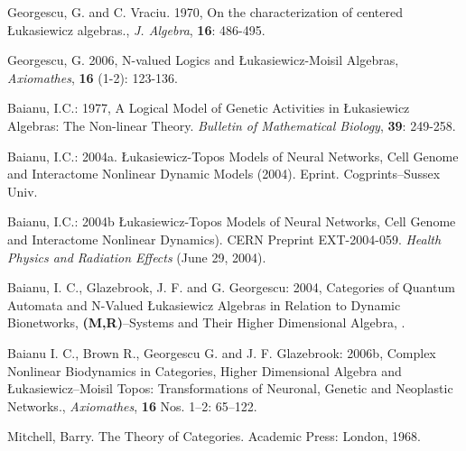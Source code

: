 \documentclass[12pt]{article}
\theoremstyle{plain}
\theoremstyle{definition}
\begin{document}
\begin{thebibliography}{9}

Georgescu, G. and C. Vraciu. 1970, On the characterization of centered \L{}ukasiewicz
algebras., {\em J. Algebra}, \textbf{16}: 486-495.

Georgescu, G. 2006, N-valued Logics and \L ukasiewicz-Moisil Algebras, \emph{Axiomathes}, \textbf{16} (1-2): 123-136.

Baianu, I.C.: 1977, A Logical Model of Genetic Activities in \L ukasiewicz Algebras: The Non-linear Theory. \emph{Bulletin of Mathematical Biology}, \textbf{39}: 249-258.

Baianu, I.C.: 2004a. \L{}ukasiewicz-Topos Models of Neural Networks, Cell Genome and Interactome Nonlinear Dynamic Models (2004). Eprint. Cogprints--Sussex Univ. 

Baianu, I.C.: 2004b \L{}ukasiewicz-Topos Models of Neural Networks, Cell Genome and Interactome Nonlinear Dynamics). CERN Preprint EXT-2004-059. \textit{Health Physics and Radiation Effects} (June 29, 2004). 
 
Baianu, I. C., Glazebrook, J. F. and G. Georgescu: 2004, Categories of Quantum Automata and N-Valued \L ukasiewicz Algebras in Relation to Dynamic Bionetworks, \textbf{(M,R)}--Systems and Their Higher Dimensional Algebra,
 . 

Baianu I. C., Brown R., Georgescu G. and J. F. Glazebrook: 2006b, Complex Nonlinear Biodynamics in Categories, Higher Dimensional Algebra and \L{}ukasiewicz--Moisil Topos: Transformations of Neuronal, Genetic and Neoplastic Networks., \emph{Axiomathes}, \textbf{16} Nos. 1--2: 65--122.

Mitchell, Barry. The Theory of Categories. Academic Press: London, 1968.

\end{thebibliography}


\end{document}
